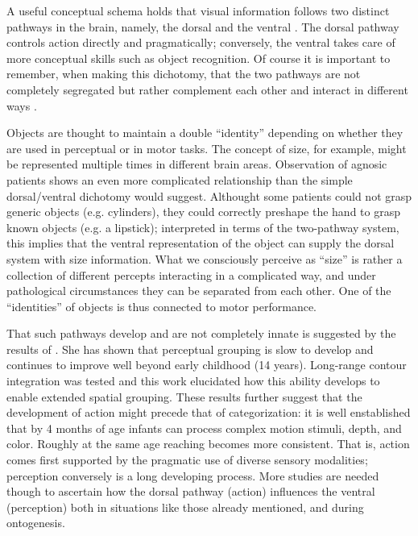 A useful conceptual schema holds that visual information follows two
distinct pathways in the brain, namely, the dorsal and the ventral
\cite{ungerleider82two,milner95visual}.
The dorsal
pathway controls action directly and pragmatically; conversely, the
ventral takes care of more conceptual skills such as object
recognition.
Of course it is important to remember, when making this dichotomy,
that the two pathways are not completely segregated but rather
complement each other and interact in different
ways \cite{jeannerod97cognitive}.


Objects are thought to maintain a double ``identity'' depending on
whether they are used in perceptual or in motor tasks. The concept of
size, for example, might be represented multiple times in different
brain areas. Observation of agnosic
patients \cite{jeannerod97cognitive} shows an even more complicated
relationship than the simple dorsal/ventral dichotomy would
suggest.  Althought some patients could not grasp generic objects
(e.g. cylinders), they could correctly preshape the hand to grasp
known objects (e.g. a lipstick); interpreted in terms of the
two-pathway system, this implies that the ventral representation of
the object can supply the dorsal system with size information. What we
consciously perceive as ``size'' is rather a collection of different
percepts interacting in a complicated way, and under pathological
circumstances they can be separated from each other. One of the
``identities'' of objects is thus connected to motor performance.

That such pathways develop and are not completely innate is suggested
by the results of \cite{kovacs00human}. She has shown that
perceptual grouping is slow to develop and continues to improve well
beyond early childhood (14 years). Long-range contour integration was
tested and this work elucidated how this ability develops to enable
extended spatial grouping. These results further suggest that the
development of action might precede that of categorization: it is well
enstablished that by 4 months of age infants can process complex
motion stimuli, depth, and color.  Roughly at the same age reaching
becomes more consistent.  That is, action comes first
supported by the pragmatic use of diverse sensory modalities;
perception conversely is a long developing process. More studies are
needed though to ascertain how the dorsal pathway (action) influences
the ventral (perception) both in situations like those
already mentioned, and during ontogenesis.

